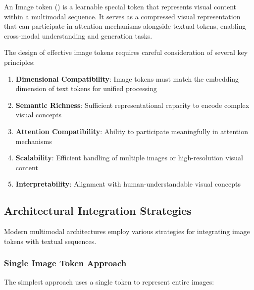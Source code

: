 \begin{definition}
An Image token (\img{}) is a learnable special token that represents visual content within a multimodal sequence. It serves as a compressed visual representation that can participate in attention mechanisms alongside textual tokens, enabling cross-modal understanding and generation tasks.
\end{definition}

The design of effective image tokens requires careful consideration of several key principles:

\begin{enumerate}
\item \textbf{Dimensional Compatibility}: Image tokens must match the embedding dimension of text tokens for unified processing
\item \textbf{Semantic Richness}: Sufficient representational capacity to encode complex visual concepts
\item \textbf{Attention Compatibility}: Ability to participate meaningfully in attention mechanisms
\item \textbf{Scalability}: Efficient handling of multiple images or high-resolution visual content
\item \textbf{Interpretability}: Alignment with human-understandable visual concepts
\end{enumerate}

\subsection{Architectural Integration Strategies}

Modern multimodal architectures employ various strategies for integrating image tokens with textual sequences.

\subsubsection{Single Image Token Approach}

The simplest approach uses a single token to represent entire images:

